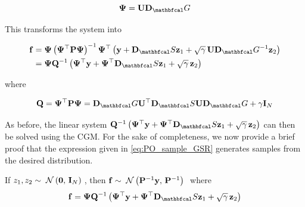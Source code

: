 \begin{equation}
    \PSI = \U \D_\Gt
\end{equation}

This transforms the system into 

\begin{align}
    \f &= \PSI \left(\PSI^\top \PP \PSI \right)^{-1} \PSI^\top \left(\y + \D_\St \z_1 + \sqrt{\gamma} \, \U \D_\Gt^{-1} \z_2 \right) \notag \\
    &= \PSI \Q^{-1} \left(\PSI^\top \y + \PSI^\top \D_\St \z_1 + \sqrt{\gamma} \, \z_2\right)
    \label{eq:PO_sample_GSR}
\end{align}

where 

$$
\Q = \PSI^\top \PP \PSI  = \D_\Gt \U^\top \D_\St \U \D_\Gt + \gamma \I_N 
$$

As before, the linear system $\Q^{-1} \left(\PSI^\top \y + \PSI^\top \D_\St \z_1 + \sqrt{\gamma} \, \z_2\right)$ can then be solved using the CGM. For the sake of completeness, we now provide a brief proof that the expression given in \cref{eq:PO_sample_GSR} generates samples from the desired distribution. 

\begin{theorem}
    If $z_1, z_2 \sim \; \mathcal{N}\left(\mathbf{0}, \, \mathbf{I}_N\right) \;$, then $\mathbf{f} \sim \; \mathcal{N}\left(\mathbf{P}^{-1} \mathbf{y} , \, \mathbf{P}^{-1}\right) \;$ where 
    $$
    \f = \PSI \Q^{-1} \left(\PSI^\top \y + \PSI^\top \D_\St \z_1 + \sqrt{\gamma} \, \z_2\right)
    $$
    \label{the:GSR_PO}
\end{theorem}

